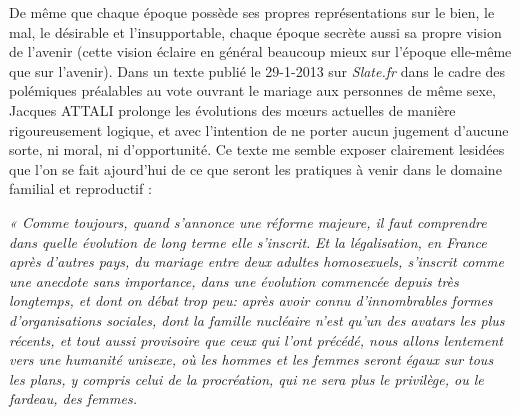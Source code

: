 
 De même que chaque époque possède ses propres représentations sur le bien, le mal, le désirable et l'insupportable, chaque époque secrète aussi sa propre vision de l'avenir (cette vision éclaire en général beaucoup mieux sur l'époque elle-même que sur l'avenir). Dans un texte publié le 29-1-2013 sur \emph{Slate.fr} dans le cadre des polémiques préalables au vote ouvrant le mariage aux personnes de même sexe, Jacques ATTALI prolonge les évolutions des mœurs actuelles de manière rigoureusement logique, et avec l'intention de ne porter aucun jugement d'aucune sorte, ni moral, ni d'opportunité. Ce texte me semble exposer clairement lesidées que l'on se fait ajourd'hui de ce que seront les pratiques à venir dans le domaine familial et reproductif :
 
 \emph{« Comme toujours, quand s'annonce une réforme majeure, il faut comprendre dans quelle évolution de long terme elle s'inscrit.}
 \emph{Et la légalisation, en France après d'autres pays, du mariage entre deux adultes homosexuels, s'inscrit comme une anecdote sans importance, dans une évolution commencée depuis très longtemps, et dont on débat trop peu: après avoir connu d'innombrables formes d'organisations sociales, dont la famille nucléaire n'est qu'un des avatars les plus récents, et tout aussi provisoire que ceux qui l'ont précédé, nous allons lentement vers une humanité unisexe, où les hommes et les femmes seront égaux sur tous les plans, y compris celui    de la procréation, qui ne sera plus le privilège, ou le fardeau, des femmes.} 
